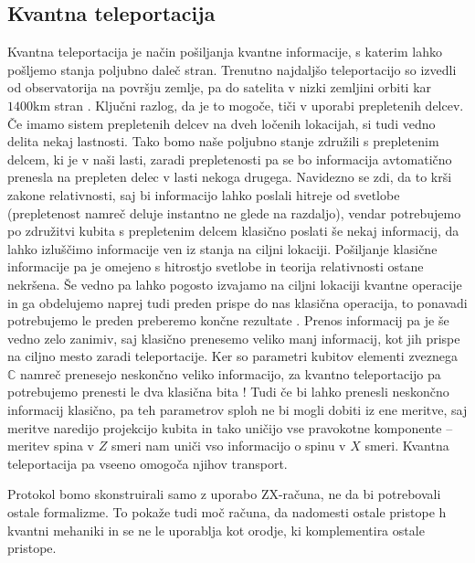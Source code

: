 \documentclass[mat1]{fmfdelo}
\newcommand{\C}{\mathbb C}
\begin{document}
\subsection{Kvantna teleportacija}
Kvantna teleportacija je način pošiljanja kvantne informacije, s katerim lahko pošljemo stanja poljubno daleč stran. Trenutno najdaljšo teleportacijo so izvedli od observatorija na površju zemlje, pa do satelita v nizki zemljini orbiti kar \(1400\unit{\kilo\metre}\) stran \cite{Ren2017}. Ključni razlog, da je to mogoče, tiči v uporabi prepletenih delcev. Če imamo sistem prepletenih delcev na dveh ločenih lokacijah, si tudi vedno delita nekaj lastnosti. Tako bomo naše poljubno stanje združili s prepletenim delcem, ki je v naši lasti, zaradi prepletenosti pa se bo informacija avtomatično prenesla na prepleten delec v lasti nekoga drugega. Navidezno se zdi, da to krši zakone relativnosti, saj bi informacijo lahko poslali hitreje od svetlobe (prepletenost namreč deluje instantno ne glede na razdaljo), vendar potrebujemo po združitvi kubita s prepletenim delcem klasično poslati še nekaj informacij, da lahko izluščimo informacije ven iz stanja na ciljni lokaciji. Pošiljanje klasične informacije pa je omejeno s hitrostjo svetlobe in teorija relativnosti ostane nekršena. Še vedno pa lahko pogosto izvajamo na ciljni lokaciji kvantne operacije in ga obdelujemo naprej tudi preden prispe do nas klasična operacija, to ponavadi potrebujemo le preden preberemo končne rezultate \cite[Poglavje 4.13]{zidko}. Prenos informacij pa je še vedno zelo zanimiv, saj klasično prenesemo veliko manj informacij, kot jih prispe na ciljno mesto zaradi teleportacije. Ker so parametri kubitov elementi zveznega \(\C\) namreč prenesejo neskončno veliko informacijo, za kvantno teleportacijo pa potrebujemo prenesti le dva klasična bita \cite[Poglavje 1.3.7]{nielsen}! Tudi če bi lahko prenesli neskončno informacij klasično, pa teh parametrov sploh ne bi mogli dobiti iz ene meritve, saj meritve naredijo projekcijo kubita in tako uničijo vse pravokotne komponente -- meritev spina v \(Z\) smeri nam uniči vso informacijo o spinu v \(X\) smeri. Kvantna teleportacija pa vseeno omogoča njihov transport.

Protokol bomo skonstruirali samo z uporabo ZX-računa, ne da bi potrebovali ostale formalizme. To pokaže tudi moč računa, da nadomesti ostale pristope h kvantni mehaniki in se ne le uporablja kot orodje, ki komplementira ostale pristope.
\end{document}
